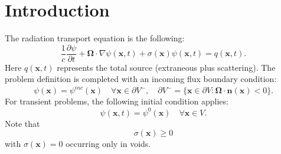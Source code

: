\section{Introduction}
The radiation transport equation is the following:
\begin{equation}\label{tr}
	\frac{1}{c}\frac{\partial \psi}{\partial t} + \mathbf{\Omega}\cdot\nabla\psi(\mathbf{x},t)
      + \sigma(\mathbf{x})\psi(\mathbf{x},t) = q(\mathbf{x},t).
\end{equation}
Here $q(\mathbf{x},t)$ represents the total source (extraneous plus scattering).
%
The problem definition is completed with an incoming flux boundary condition:
\begin{equation}
   \psi(\mathbf{x}) = \psi^{inc}(\mathbf{x})  \quad \forall \mathbf{x}\in \partial V^-,
      \quad \partial V^- = \{\mathbf{x}\in\partial V: \mathbf{\Omega}\cdot\mathbf{n}(\mathbf{x})<0\}.
\end{equation}
For transient problems, the following initial condition applies:
\begin{equation}
   \psi(\mathbf{x},t) = \psi^0(\mathbf{x})  \quad \forall \mathbf{x}\in V.
\end{equation}
Note that
\[
   \sigma(\mathbf{x}) \ge 0
\]
with $\sigma(\mathbf{x})=0$ occurring only in voids.